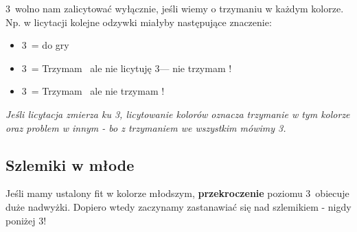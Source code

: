 \documentclass[12pt, a4paper]{article}
\begin{document}
    3\nt\ wolno nam zalicytować wyłącznie, jeśli wiemy o trzymaniu w każdym kolorze.
    Np. w licytacji
    {}
    kolejne odzywki miałyby następujące znaczenie:
    \begin{itemize}
        \item 3\nt\ = do gry
        \item 3\diams\ = Trzymam \diams\, ale nie licytuję 3\nt --- nie trzymam \spades!
        \item 3\spades\ = Trzymam \spades\, ale nie trzymam \diams!
    \end{itemize}
    \begin{formal}
        \itshape
        Jeśli licytacja zmierza ku 3\nt, licytowanie kolorów oznacza trzymanie w tym kolorze
        oraz problem w innym - bo z trzymaniem we wszystkim mówimy 3\nt.
    \end{formal}

    \subsection{Szlemiki w młode}
    Jeśli mamy ustalony fit w kolorze młodszym, \textbf{przekroczenie} poziomu 3\nt\ obiecuje
    duże nadwyżki. Dopiero wtedy zaczynamy zastanawiać się nad szlemikiem - nigdy poniżej 3\nt!
\end{document}
